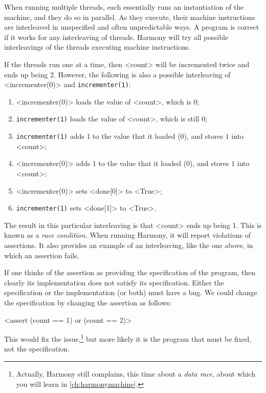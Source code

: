 \documentclass{report}
\newenvironment{code}{
\tcolorbox
}{
\endtcolorbox
}
\begin{document}
When running multiple threads, each essentially runs an instantiation of
the machine, and they do so in parallel.  As they execute, their machine
instructions are interleaved
%
in unspecified and often unpredictable ways.
A program is correct if it works for any interleaving of threads.
Harmony will try all possible interleavings of the threads
executing machine instructions.

If the threads run one at a time, then <{count}> will be incremented
twice and ends up being 2.  However, the following is also
a possible interleaving of <{incrementer(0)}> and \texttt{incrementer(1)}:
\begin{enumerate}
\item <{incrementer(0)}> loads the value of <{count}>, which is 0;
\item \texttt{incrementer(1)} loads the value of <{count}>, which is still 0;
\item \texttt{incrementer(1)} adds 1 to the value that it loaded (0), and
stores $1$ into <{count}>;
\item <{incrementer(0)}> adds 1 to the value that it loaded (0), and
stores $1$ into <{count}>;
\item <{incrementer(0)}> sets <{done[0]}> to <{True}>;
\item \texttt{incrementer(1)} sets <{done[1]}> to <{True}>.
\end{enumerate}

The result in this particular interleaving is that <{count}> ends up
being 1.
This is known as a \emph{race condition}.
%
When running Harmony, it will
report violations of assertions.  It also provides an example
of an interleaving, like the one above, in which an assertion fails.

%

If one thinks of the assertion as providing the specification of the
program, then clearly its implementation does not satisfy its specification.
Either the specification or the implementation (or both) must have a bug.
We could change the specification by changing the assertion as follows:

\begin{code}
<{assert (count == 1) or (count == 2)}>
\end{code}

This would fix the issue,\footnote{Actually, Harmony still complains, this time
about a \emph{data race}, about which you will learn in \autoref{ch:harmonymachine}.}
but more likely it is the program that must be fixed, not the specification.
\end{document}
